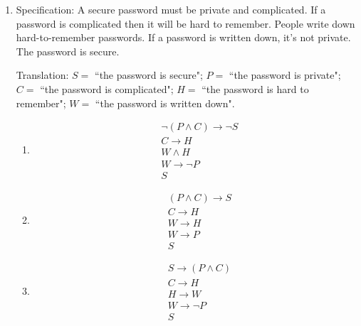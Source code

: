 \begin{enumerate}
    \begin{multicols}{3}
    \begin{enumerate}
        \item[] \begin{align*} &T \to C \\&  \neg T \to \neg C \end{align*}
        \item[] \begin{align*} &T \wedge C \\  & \neg  T \wedge \neg C \end{align*}
        \item[] \begin{align*} &T \to \neg T  \\ & C  \to \neg  C \end{align*}
    \end{enumerate}
    \end{multicols}

    \item Specification: A secure password must be private and complicated. If
    a password is  complicated then  it will be hard to  remember.  People
    write down hard-to-remember passwords. If a password is written down, it's  not private.   The password is secure.

    Translation: $S =$ ``the password is secure"; $P = $ ``the password is private"; 
    $C = $  ``the password is  complicated"; $H = $ ``the password is hard to remember";
    $W =  $ ``the password is written down".
    
    \begin{multicols}{3}
    \begin{enumerate}
        \item[] \begin{align*} &\neg (P \wedge C) \to \neg  S  \\ & C \to H  \\ & W \wedge H \\ & W \to  \neg P \\ & S \end{align*}
        \item[] \begin{align*} &(P \wedge  C)  \to S  \\ &  C \to H\\ & W  \to  H \\  & W \to P \\ & S\end{align*}
        \item[] \begin{align*} & S  \to (P \wedge C)  \\ &  C \to H\\ & H  \to  W \\  & W \to \neg P \\ & S\end{align*}
    \end{enumerate}
    \end{multicols}
\end{enumerate}